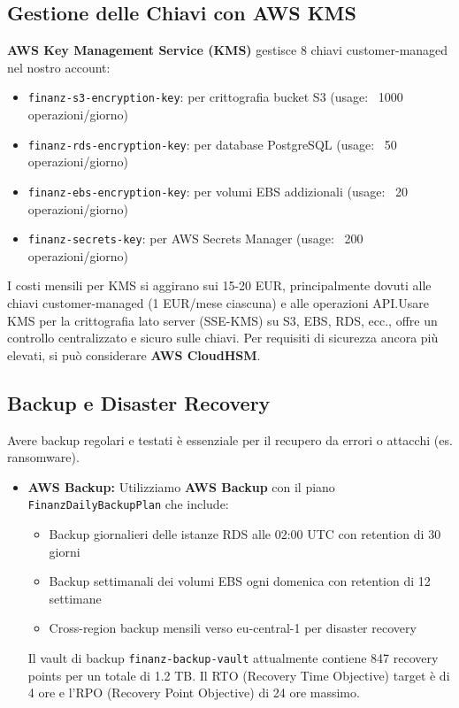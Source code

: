\subsection{Gestione delle Chiavi con AWS KMS}
\label{subsec:kms}
\textbf{AWS Key Management Service (KMS)} gestisce 8 chiavi customer-managed nel nostro account:
\begin{itemize}
    \item \texttt{finanz-s3-encryption-key}: per crittografia bucket S3 (usage: ~1000 operazioni/giorno)
    \item \texttt{finanz-rds-encryption-key}: per database PostgreSQL (usage: ~50 operazioni/giorno)
    \item \texttt{finanz-ebs-encryption-key}: per volumi EBS addizionali (usage: ~20 operazioni/giorno)
    \item \texttt{finanz-secrets-key}: per AWS Secrets Manager (usage: ~200 operazioni/giorno)
\end{itemize}
I costi mensili per KMS si aggirano sui 15-20 EUR, principalmente dovuti alle chiavi customer-managed (1 EUR/mese ciascuna) e alle operazioni API.Usare KMS per la crittografia lato server (SSE-KMS) su S3, EBS, RDS, ecc., offre un controllo centralizzato e sicuro sulle chiavi. Per requisiti di 
sicurezza ancora più elevati, si può considerare \textbf{AWS CloudHSM}.

\subsection{Backup e Disaster Recovery}
\label{subsec:backup-dr}
Avere backup regolari e testati è essenziale per il recupero da errori o attacchi (es. ransomware).
\begin{itemize}
    \item \textbf{AWS Backup:} Utilizziamo \textbf{AWS Backup} con il piano \texttt{FinanzDailyBackupPlan} che include:
        \begin{itemize}
            \item Backup giornalieri delle istanze RDS alle 02:00 UTC con retention di 30 giorni
            \item Backup settimanali dei volumi EBS ogni domenica con retention di 12 settimane  
            \item Cross-region backup mensili verso eu-central-1 per disaster recovery
        \end{itemize}
        Il vault di backup \texttt{finanz-backup-vault} attualmente contiene 847 recovery points per un totale di 1.2 TB. Il RTO (Recovery Time Objective) target è di 4 ore e l'RPO (Recovery Point Objective) di 24 ore massimo.
\end{itemize}

